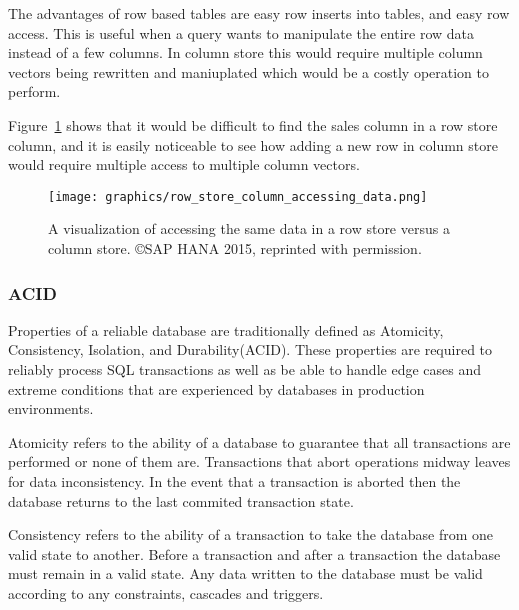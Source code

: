 \documentclass[letterpaper, 12pt]{article}
\begin{document}
The advantages of row based tables are easy row inserts into tables, and easy row access. This is useful when a query
wants to manipulate the entire row data instead of a few columns. In column store this would require multiple column vectors
being rewritten and maniuplated which would be a costly operation to perform.
\par\vspace{\baselineskip}

Figure~\ref{fig:row_col_access_data} shows that it would be 
difficult to find the sales column in a row store column, and it is easily
noticeable to see how adding a new row in column store would require multiple
access to multiple column vectors.
\par\vspace{\baselineskip}

\begin{figure}[H]
  \centering
  \texttt{[image: graphics/row\_store\_column\_accessing\_data.png]}
  \caption{A visualization of accessing the same data in a row store versus a column store. \copyright SAP HANA 2015, reprinted with permission.\cite{saphana}}
  \label{fig:row_col_access_data}
\end{figure}

\subsubsection{ACID}
Properties of a reliable database are traditionally defined as Atomicity, Consistency, Isolation, 
and Durability(ACID). These properties are required to reliably process SQL transactions as well as
be able to handle edge cases and extreme conditions that are experienced by databases in 
production environments.
\par\vspace{\baselineskip}

Atomicity refers to the ability of a database to guarantee that all transactions
are performed or none of them are. Transactions that abort operations midway leaves
for data inconsistency. In the event that a transaction is aborted then the database
returns to the last commited transaction state.
\par\vspace{\baselineskip}

Consistency refers to the ability of a transaction to take the database from one valid state
to another. Before a transaction and after a transaction the database must remain in a valid state.
Any data written to the database must be valid according to any constraints, cascades and triggers.
\par\vspace{\baselineskip}
\end{document}
